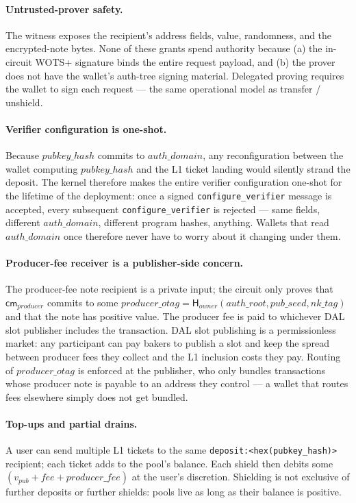\documentclass[11pt]{article}
\newcommand{\Hash}{\mathsf{H}}
\newcommand{\cm}{\mathsf{cm}}
\newcommand{\depositkey}{\texttt{deposit:}\allowbreak\texttt{<hex(}\allowbreak\texttt{pubkey\_hash}\allowbreak\texttt{)>}}
\begin{document}
\paragraph{Untrusted-prover safety.} The witness exposes the recipient's
address fields, value, randomness, and the encrypted-note bytes. None of these
grants spend authority because (a) the in-circuit WOTS+ signature binds the
entire request payload, and (b) the prover does not have the wallet's
auth-tree signing material. Delegated proving requires the wallet to
sign each request — the same operational model as transfer / unshield.

\paragraph{Verifier configuration is one-shot.} Because
\(pubkey\_hash\) commits to \(auth\_domain\), any reconfiguration
between the wallet computing \(pubkey\_hash\) and the L1 ticket landing
would silently strand the deposit. The kernel therefore makes the
entire verifier configuration one-shot for the lifetime of the
deployment: once a signed \texttt{configure\_verifier} message is
accepted, every subsequent \texttt{configure\_verifier} is rejected —
same fields, different \(auth\_domain\), different program hashes,
anything. Wallets that read \(auth\_domain\) once therefore never have
to worry about it changing under them.

\paragraph{Producer-fee receiver is a publisher-side concern.} The
producer-fee note recipient is a private input; the circuit only proves
that \(\cm_{producer}\) commits to some
\(producer\_otag = \Hash_{owner}(auth\_root, pub\_seed, nk\_tag)\) and
that the note has positive value. The producer fee is paid to whichever
DAL slot publisher includes the transaction. DAL slot publishing is a
permissionless market: any participant can pay bakers to publish a slot
and keep the spread between producer fees they collect and the L1
inclusion costs they pay. Routing of \(producer\_otag\) is enforced at
the publisher, who only bundles transactions whose producer note is
payable to an address they control — a wallet that routes fees
elsewhere simply does not get bundled.

\paragraph{Top-ups and partial drains.} A user can send multiple L1
tickets to the same \depositkey{} recipient; each
ticket adds to the pool's balance. Each shield then debits some
\((v_{pub} + fee + producer\_fee)\) at the user's discretion. Shielding
is not exclusive of further deposits or further shields: pools live as
long as their balance is positive.
\end{document}

